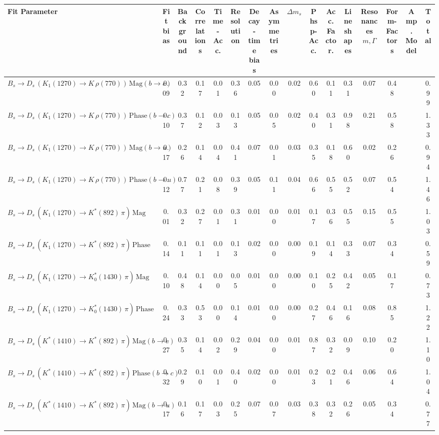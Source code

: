 \begin{tabular}{l  c  c  c  c  c  c  c  c  c  c  c  c  c  c  | c }
\hline
\hline
Fit Parameter & Fit bias & Background & Correlations & Time-Acc. & Resolution & Decay-time bias & Asymmetries & $\Delta m_{s}$ & Phsp-Acc. & Acc. Factor. & Lineshapes & Resonances $m,\Gamma$ & Form-Factors & Amp. Model &  Total  \\ 
\hline
$B_s \to D_s \, ( K_1(1270) \to K \, \rho(770) )  \, \text{Mag} (b \to c)$ & 0.09 & 0.32 & 0.17 & 0.01 & 0.36 & 0.05 & 0.00 & 0.02 & 0.60 & 0.11 & 0.31 & 0.07 & 0.48 &  & 0.99 \\ 
$B_s \to D_s \, ( K_1(1270) \to K \, \rho(770) ) \, \text{Phase} (b \to c)$ & 0.10 & 0.37 & 0.12 & 0.03 & 0.13 & 0.05 & 0.05 & 0.02 & 0.40 & 0.31 & 0.98 & 0.21 & 0.58 &  & 1.33 \\ 
$B_s \to D_s \, ( K_1(1270) \to K \, \rho(770) ) \, \text{Mag} (b \to u)$ & 0.17 & 0.26 & 0.14 & 0.04 & 0.41 & 0.07 & 0.01 & 0.03 & 0.35 & 0.18 & 0.60 & 0.02 & 0.26 &  & 0.94 \\ 
$B_s \to D_s \, ( K_1(1270) \to K \, \rho(770) ) \, \text{Phase} (b \to u)$ & 0.12 & 0.77 & 0.21 & 0.08 & 0.39 & 0.05 & 0.11 & 0.04 & 0.66 & 0.55 & 0.52 & 0.07 & 0.54 &  & 1.46 \\ 
$B_s \to D_s \, ( K_1(1270) \to K^{*}(892) \, \pi ) \, \text{Mag}$ & 0.01 & 0.32 & 0.27 & 0.01 & 0.31 & 0.01 & 0.00 & 0.01 & 0.17 & 0.36 & 0.55 & 0.15 & 0.55 &  & 1.03 \\ 
$B_s \to D_s \, ( K_1(1270) \to K^{*}(892) \, \pi ) \, \text{Phase}$ & 0.14 & 0.11 & 0.11 & 0.01 & 0.13 & 0.02 & 0.00 & 0.00 & 0.19 & 0.14 & 0.33 & 0.07 & 0.34 &  & 0.59 \\ 
$B_s \to D_s \, ( K_1(1270) \to K^{*}_{0}(1430) \, \pi ) \, \text{Mag} $ & 0.10 & 0.48 & 0.14 & 0.00 & 0.05 & 0.01 & 0.00 & 0.00 & 0.10 & 0.25 & 0.42 & 0.05 & 0.17 &  & 0.73 \\ 
$B_s \to D_s \, ( K_1(1270) \to K^{*}_{0}(1430) \, \pi ) \, \text{Phase} $ & 0.24 & 0.33 & 0.53 & 0.00 & 0.14 & 0.01 & 0.00 & 0.00 & 0.27 & 0.46 & 0.16 & 0.08 & 0.85 &  & 1.22 \\ 
$B_s \to D_s \, ( K^{*}(1410) \to K^{*}(892) \, \pi ) \, \text{Mag} (b \to c)$ & 0.27 & 0.35 & 0.14 & 0.02 & 0.29 & 0.04 & 0.00 & 0.01 & 0.87 & 0.32 & 0.09 & 0.10 & 0.20 &  & 1.10 \\ 
$B_s \to D_s \, ( K^{*}(1410) \to K^{*}(892) \, \pi ) \, \text{Phase} (b \to c)$ & 0.32 & 0.29 & 0.10 & 0.01 & 0.40 & 0.02 & 0.00 & 0.01 & 0.23 & 0.21 & 0.46 & 0.06 & 0.64 &  & 1.04 \\ 
$B_s \to D_s \, ( K^{*}(1410) \to K^{*}(892) \, \pi ) \, \text{Mag} (b \to u)$ & 0.17 & 0.16 & 0.17 & 0.03 & 0.25 & 0.07 & 0.07 & 0.03 & 0.38 & 0.32 & 0.26 & 0.05 & 0.34 &  & 0.77 \\ 

\end{tabular}
